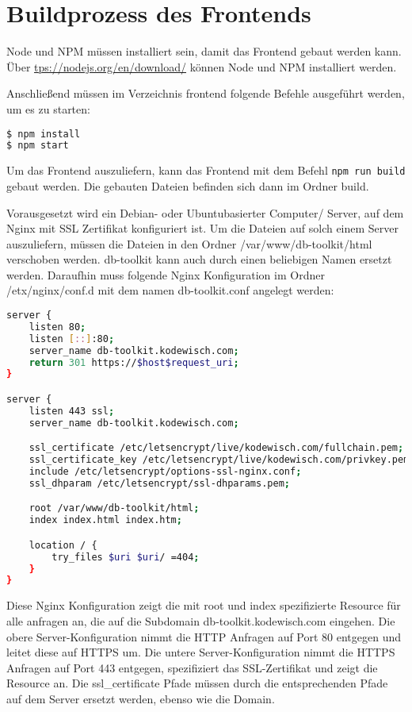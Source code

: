 \section{Buildprozess des Frontends}
\label{sec:build_frontend}

Node und NPM müssen installiert sein, damit das Frontend gebaut werden kann.
Über \url{tps://nodejs.org/en/download/} können Node und NPM installiert werden.

Anschließend müssen im Verzeichnis frontend folgende Befehle ausgeführt werden, um es zu starten:

\begin{lstlisting}[language=bash, caption={Frontend build commands},label={lst:fe_build_commands}]
$ npm install
$ npm start
\end{lstlisting}    

Um das Frontend auszuliefern, kann das Frontend mit dem Befehl \lstinline{npm run build} gebaut werden.
Die gebauten Dateien befinden sich dann im Ordner build.

Vorausgesetzt wird ein Debian- oder Ubuntubasierter Computer/ Server, auf dem Nginx mit SSL Zertifikat konfiguriert ist.
Um die Dateien auf solch einem Server auszuliefern, müssen die Dateien in den Ordner /var/www/db-toolkit/html verschoben werden.
db-toolkit kann auch durch einen beliebigen Namen ersetzt werden.
Daraufhin muss folgende Nginx Konfiguration im Ordner /etx/nginx/conf.d mit dem namen db-toolkit.conf angelegt werden:

\begin{lstlisting}[language=bash, caption={db-toolkit.conf},label={lst:db-toolkit.conf}]
server { 
    listen 80; 
    listen [::]:80; 
    server_name db-toolkit.kodewisch.com; 
    return 301 https://$host$request_uri; 
} 

server { 
    listen 443 ssl; 
    server_name db-toolkit.kodewisch.com;

    ssl_certificate /etc/letsencrypt/live/kodewisch.com/fullchain.pem; 
    ssl_certificate_key /etc/letsencrypt/live/kodewisch.com/privkey.pem; 
    include /etc/letsencrypt/options-ssl-nginx.conf; 
    ssl_dhparam /etc/letsencrypt/ssl-dhparams.pem; 

    root /var/www/db-toolkit/html;
    index index.html index.htm;

    location / { 
        try_files $uri $uri/ =404; 
    } 
}
\end{lstlisting}    

Diese Nginx Konfiguration zeigt die mit root und index spezifizierte Resource für alle anfragen an, die auf die Subdomain db-toolkit.kodewisch.com eingehen.
Die obere Server-Konfiguration nimmt die HTTP Anfragen auf Port 80 entgegen und leitet diese auf HTTPS um.
Die untere Server-Konfiguration nimmt die HTTPS Anfragen auf Port 443 entgegen, spezifiziert das SSL-Zertifikat und zeigt die Resource an.
Die ssl\_certificate Pfade müssen durch die entsprechenden Pfade auf dem Server ersetzt werden, ebenso wie die Domain.
